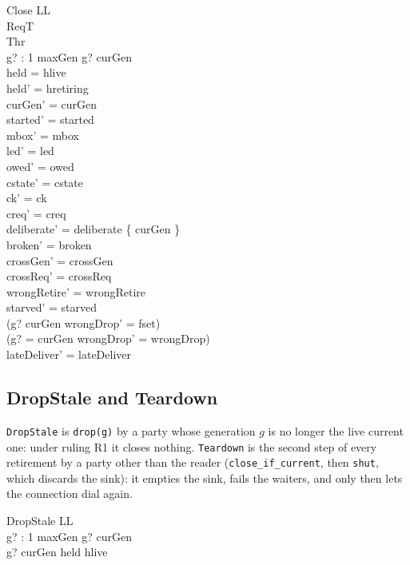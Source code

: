 \documentclass[a4paper,10pt,fleqn]{article}
\begin{document}
\begin{schema}{Close}
  \Delta LL \\
  \Xi ReqT \\
  \Xi Thr \\
  g? : 1 \upto maxGen
\where
  g? \leq curGen \\
  held = hlive \\
  held' = hretiring \\
  curGen' = curGen \\
  started' = started \\
  mbox' = mbox \\
  led' = led \\
  owed' = owed \\
  cstate' = cstate \\
  ck' = ck \\
  creq' = creq \\
  deliberate' = deliberate \cup \{ curGen \} \\
  broken' = broken \\
  crossGen' = crossGen \\
  crossReq' = crossReq \\
  wrongRetire' = wrongRetire \\
  starved' = starved \\
  (g? \neq curGen \implies wrongDrop' = fset) \\
  (g? = curGen \implies wrongDrop' = wrongDrop) \\
  lateDeliver' = lateDeliver
\end{schema}

\subsection{DropStale and Teardown}

\texttt{DropStale} is \texttt{drop(g)} by a party whose generation $g$ is no
longer the live current one: under ruling R1 it closes nothing.
\texttt{Teardown} is the second step of every retirement by a party other than
the reader (\texttt{close\_if\_current}, then \texttt{shut}, which discards the
sink): it empties the sink, fails the waiters, and only then lets the connection
dial again.

\begin{schema}{DropStale}
  \Xi LL \\
  g? : 1 \upto maxGen
\where
  g? \leq curGen \\
  g? \neq curGen \lor held \neq hlive
\end{schema}
\end{document}
